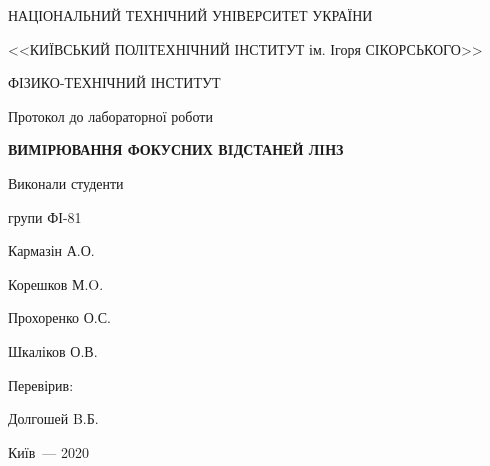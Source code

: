 \thispagestyle{empty}

\begin{center}
НАЦІОНАЛЬНИЙ ТЕХНІЧНИЙ УНІВЕРСИТЕТ УКРАЇНИ \par
<<КИЇВСЬКИЙ ПОЛІТЕХНІЧНИЙ ІНСТИТУТ ім. Ігоря СІКОРСЬКОГО>>\par
ФІЗИКО-ТЕХНІЧНИЙ ІНСТИТУТ\par

\vspace{5cm}
{\huge Протокол до лабораторної роботи \par}

\huge\MakeUppercase{\textbf{ Вимiрювання фокусних вiдстаней лiнз }} \par
\end{center}

\vspace{2cm}
\begin{flushright}
Виконали студенти 

групи ФІ-81

\bigbreak

Кармазін А.О.

Корешков М.O.

Прохоренко О.С.

Шкаліков О.В.

\vspace{20mm}
Перевірив:

Долгошей B.Б.

\end{flushright}

\vspace{6cm}
\begin{center}
{Київ~--- 2020}
\end{center}

\newpage
